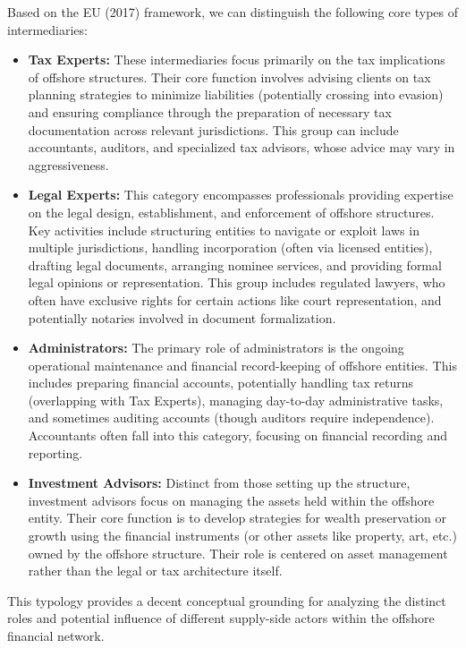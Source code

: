 Based on the EU (2017) framework, we can distinguish the following core types of intermediaries:
\begin{itemize}[leftmargin=*]
    \item \textbf{Tax Experts:} These intermediaries focus primarily on the tax implications of offshore structures. Their core function involves advising clients on tax planning strategies to minimize liabilities (potentially crossing into evasion) and ensuring compliance through the preparation of necessary tax documentation across relevant jurisdictions. This group can include accountants, auditors, and specialized tax advisors, whose advice may vary in aggressiveness.
    
    \item \textbf{Legal Experts:} This category encompasses professionals providing expertise on the legal design, establishment, and enforcement of offshore structures. Key activities include structuring entities to navigate or exploit laws in multiple jurisdictions, handling incorporation (often via licensed entities), drafting legal documents, arranging nominee services, and providing formal legal opinions or representation. This group includes regulated lawyers, who often have exclusive rights for certain actions like court representation, and potentially notaries involved in document formalization.
    
    \item \textbf{Administrators:} The primary role of administrators is the ongoing operational maintenance and financial record-keeping of offshore entities. This includes preparing financial accounts, potentially handling tax returns (overlapping with Tax Experts), managing day-to-day administrative tasks, and sometimes auditing accounts (though auditors require independence). Accountants often fall into this category, focusing on financial recording and reporting.
    
    \item \textbf{Investment Advisors:} Distinct from those setting up the structure, investment advisors focus on managing the assets held within the offshore entity. Their core function is to develop strategies for wealth preservation or growth using the financial instruments (or other assets like property, art, etc.) owned by the offshore structure. Their role is centered on asset management rather than the legal or tax architecture itself.
\end{itemize}
This typology provides a decent conceptual grounding for analyzing the distinct roles and potential influence of different supply-side actors within the offshore financial network.

